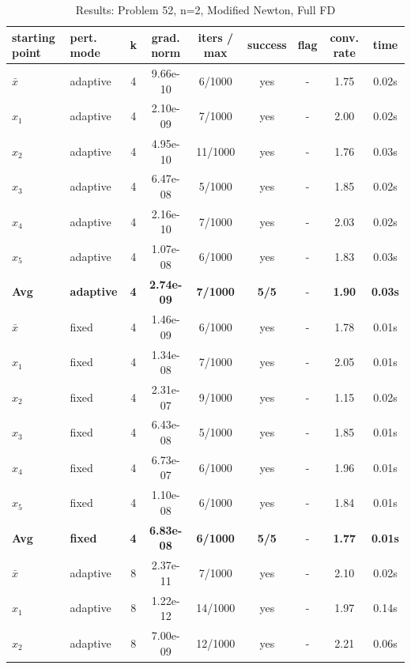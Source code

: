 

\begin{longtable}{|l|l|c|c|c|c|c|c|c|}
\caption{Results: Problem 52, n=2, Modified Newton, Full FD} \\
\hline
\textbf{starting point} & \textbf{pert. mode} & \textbf{k} & \textbf{grad. norm} & \textbf{iters / max} & \textbf{success} & \textbf{flag} & \textbf{conv. rate} & \textbf{time} \\
\hline
\endfirsthead
\endhead
\endfoot
\hline
\endlastfoot
$\bar{x}$ & adaptive & 4 & 9.66e-10 & 6/1000 & yes & - & 1.75 & 0.02s \\
\hline
$x_1$ & adaptive & 4 & 2.10e-09 & 7/1000 & yes & - & 2.00 & 0.02s \\
\hline
$x_2$ & adaptive & 4 & 4.95e-10 & 11/1000 & yes & - & 1.76 & 0.03s \\
\hline
$x_3$ & adaptive & 4 & 6.47e-08 & 5/1000 & yes & - & 1.85 & 0.02s \\
\hline
$x_4$ & adaptive & 4 & 2.16e-10 & 7/1000 & yes & - & 2.03 & 0.02s \\
\hline
$x_5$ & adaptive & 4 & 1.07e-08 & 6/1000 & yes & - & 1.83 & 0.03s \\
\hline
\hline\hline
\textbf{Avg} & \textbf{adaptive} & \textbf{4} & \textbf{2.74e-09} & \textbf{7/1000} & \textbf{5/5} & - & \textbf{1.90} & \textbf{0.03s} \\
\hline\hline
\hline
$\bar{x}$ & fixed & 4 & 1.46e-09 & 6/1000 & yes & - & 1.78 & 0.01s \\
\hline
$x_1$ & fixed & 4 & 1.34e-08 & 7/1000 & yes & - & 2.05 & 0.01s \\
\hline
$x_2$ & fixed & 4 & 2.31e-07 & 9/1000 & yes & - & 1.15 & 0.02s \\
\hline
$x_3$ & fixed & 4 & 6.43e-08 & 5/1000 & yes & - & 1.85 & 0.01s \\
\hline
$x_4$ & fixed & 4 & 6.73e-07 & 6/1000 & yes & - & 1.96 & 0.01s \\
\hline
$x_5$ & fixed & 4 & 1.10e-08 & 6/1000 & yes & - & 1.84 & 0.01s \\
\hline
\hline\hline
\textbf{Avg} & \textbf{fixed} & \textbf{4} & \textbf{6.83e-08} & \textbf{6/1000} & \textbf{5/5} & - & \textbf{1.77} & \textbf{0.01s} \\
\hline\hline
$\bar{x}$ & adaptive & 8 & 2.37e-11 & 7/1000 & yes & - & 2.10 & 0.02s \\
\hline
$x_1$ & adaptive & 8 & 1.22e-12 & 14/1000 & yes & - & 1.97 & 0.14s \\
\hline
$x_2$ & adaptive & 8 & 7.00e-09 & 12/1000 & yes & - & 2.21 & 0.06s \\

\end{longtable}
